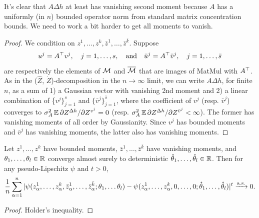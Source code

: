 \documentclass[main.tex]{subfiles}
\begin{document}
It's clear that $A\Delta h$ at least has vanishing second moment because $A$ has a uniformly (in $n$) bounded operator norm from standard matrix concentration bounds. We need to work a bit harder to get all moments to vanish.
\begin{proof}
We condition on $z^{1},\ldots,z^{k},\bar{z}^{1},\ldots,\bar{z}^{\bar{k}}$. Suppose
\[
u^{j}=A^{\top}v^{j},\quad j=1,\ldots,s,\quad\text{and}\quad\bar{u}^{j}=A^{\top}\bar{v}^{j},\quad j=1,\ldots,\bar{s}
\]
are respectively the elements of $\mathcal{M}$ and $\overline{\mathcal{M}}$ that are images of MatMul with $A^{\top}$. As in the ($\hat{Z}$, $\dot{Z}$)-decomposition in the $n\to\infty$ limit, we can write $A\Delta h$, for finite $n$, as a sum of 1) a Gaussian vector with vanishing 2nd moment and 2) a linear combination of \{$v^{j}\}_{j=1}^{s}$ and $\{\bar{v}^{j}\}_{j=1}^{\bar{s}}$, where the coefficient of $v^{j}$ (resp. $\bar{v}^{j}$) converges to $\sigma_{A}^{2}\operatorname*{\mathbb{E}}\partial Z^{\Delta h}/\partial Z^{v^{j}}=0$ (resp. $\sigma_{A}^{2}\operatorname*{\mathbb{E}}\partial Z^{\Delta h}/\partial Z^{\bar{v}^{j}}<\infty$). The former has vanishing moments of all order by Gaussianity. Since $v^{j}$ has bounded moments and $\bar{v}^{j}$ has vanishing moments, the latter also has vanishing moments.
\end{proof}
\begin{lemma}
\label{lemma:removeVanishing}Let $z^{1},\ldots,z^{k}$ have bounded moments, $\bar{z}^{1},\ldots,\bar{z}^{\bar{k}}$ have vanishing moments, and $\theta_{1},\ldots,\theta_{l}\in\mathbb{R}$ converge almost surely to deterministic $\mathring{\theta}_{1},\ldots,\mathring{\theta}_{l}\in\mathbb{R}$. Then for any pseudo-Lipschitz $\psi$ and $t>0$,
\[
\frac{1}{n}\sum_{\alpha=1}^{n}|\psi(z_{\alpha}^{1},\ldots,z_{\alpha}^{k},\bar{z}_{\alpha}^{1},\ldots,\bar{z}_{\alpha}^{\bar{k}};\theta_{1},\ldots\theta_{l})-\psi(z_{\alpha}^{1},\ldots,z_{\alpha}^{k},0,\ldots,0;\mathring{\theta}_{1},\ldots,\mathring{\theta}_{l})|^t \xrightarrow{\mathrm{a.s.}}0.
\]
\end{lemma}
\begin{proof}
  Holder's inequality.
\end{proof}
\end{document}
